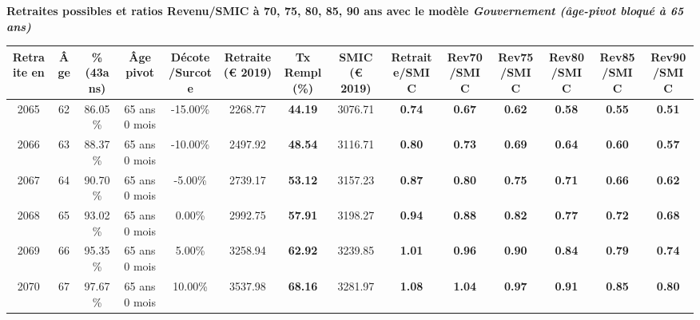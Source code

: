 {\bf \noindent Retraites possibles et ratios Revenu/SMIC à 70, 75, 80, 85, 90 ans avec le modèle \emph{Gouvernement (âge-pivot bloqué à 65 ans)}}  
 
\begin{adjustbox}{max width=\textwidth} 
\begin{tabular}[htb]{|c|c||c|c|c||c|c||c||c|c|c|c|c|c|} 
\hline 
 Retraite en &  Âge &  \%(43ans) &  Âge pivot &  Décote/Surcote &  Retraite (\euro{} 2019) &  Tx Rempl(\%) &  SMIC (\euro{} 2019) &  Retraite/SMIC &  Rev70/SMIC &  Rev75/SMIC &  Rev80/SMIC &  Rev85/SMIC &  Rev90/SMIC \\ 
\hline \hline 
 2065 &  62 &  86.05\% &  65 ans 0 mois &  -15.00\% &  2268.77 &  {\bf 44.19} &  3076.71 &  {\bf {\color{red} 0.74}} &  {\bf {\color{red} 0.67}} &  {\bf {\color{red} 0.62}} &  {\bf {\color{red} 0.58}} &  {\bf {\color{red} 0.55}} &  {\bf {\color{red} 0.51}} \\ 
\hline 
 2066 &  63 &  88.37\% &  65 ans 0 mois &  -10.00\% &  2497.92 &  {\bf 48.54} &  3116.71 &  {\bf {\color{red} 0.80}} &  {\bf {\color{red} 0.73}} &  {\bf {\color{red} 0.69}} &  {\bf {\color{red} 0.64}} &  {\bf {\color{red} 0.60}} &  {\bf {\color{red} 0.57}} \\ 
\hline 
 2067 &  64 &  90.70\% &  65 ans 0 mois &  -5.00\% &  2739.17 &  {\bf 53.12} &  3157.23 &  {\bf {\color{red} 0.87}} &  {\bf {\color{red} 0.80}} &  {\bf {\color{red} 0.75}} &  {\bf {\color{red} 0.71}} &  {\bf {\color{red} 0.66}} &  {\bf {\color{red} 0.62}} \\ 
\hline 
 2068 &  65 &  93.02\% &  65 ans 0 mois &  0.00\% &  2992.75 &  {\bf 57.91} &  3198.27 &  {\bf {\color{red} 0.94}} &  {\bf {\color{red} 0.88}} &  {\bf {\color{red} 0.82}} &  {\bf {\color{red} 0.77}} &  {\bf {\color{red} 0.72}} &  {\bf {\color{red} 0.68}} \\ 
\hline 
 2069 &  66 &  95.35\% &  65 ans 0 mois &  5.00\% &  3258.94 &  {\bf 62.92} &  3239.85 &  {\bf 1.01} &  {\bf {\color{red} 0.96}} &  {\bf {\color{red} 0.90}} &  {\bf {\color{red} 0.84}} &  {\bf {\color{red} 0.79}} &  {\bf {\color{red} 0.74}} \\ 
\hline 
 2070 &  67 &  97.67\% &  65 ans 0 mois &  10.00\% &  3537.98 &  {\bf 68.16} &  3281.97 &  {\bf 1.08} &  {\bf 1.04} &  {\bf {\color{red} 0.97}} &  {\bf {\color{red} 0.91}} &  {\bf {\color{red} 0.85}} &  {\bf {\color{red} 0.80}} \\ 
\hline 
\hline 
\end{tabular} 
\end{adjustbox} 
 
